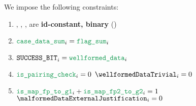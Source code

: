 We impose the following constraints:
\begin{enumerate}
    \item \malformedDataInternalJustification{}, \malformedDataExternalJustification{}, \wellformedDataTrivial{}, \wellformedDataNonTrivial{}  are \textbf{id-constant, binary} \quad (\trash)
    \item $\locCaseDataSum _{i} = \locFlagSum        _{i}$
    \item $\blsSuccessBit  _{i} = \locWellformedData _{i}$
    \item \If $\locIsBlsPairingCheck _{i} = 0$ \Then $\wellformedDataTrivial _{i} = 0$
    \item \If $\locIsBlsMapFpToGOne _{i} + \locIsBlsMapFpTwoToGTwo _{i} = 1$ \Then $\malformedDataExternalJustification _{i} = 0$
\end{enumerate}

